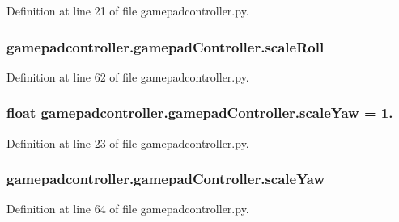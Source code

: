 Definition at line 21 of file gamepadcontroller.\-py.

\hypertarget{classgamepadcontroller_1_1gamepadController_aba4b8e93dc52cb30c7069a366ab03bcc}{
\subsubsection[{scale\-Roll}]{\setlength{\rightskip}{0pt plus 5cm}gamepadcontroller.\-gamepad\-Controller.\-scale\-Roll}}\label{classgamepadcontroller_1_1gamepadController_aba4b8e93dc52cb30c7069a366ab03bcc}


Definition at line 62 of file gamepadcontroller.\-py.

\hypertarget{classgamepadcontroller_1_1gamepadController_a5b8de0ec2f3c6f1a81997266e1b91d24}{
\subsubsection[{scale\-Yaw}]{\setlength{\rightskip}{0pt plus 5cm}float gamepadcontroller.\-gamepad\-Controller.\-scale\-Yaw = 1.\hspace{0.3cm}{\ttfamily [static]}}}\label{classgamepadcontroller_1_1gamepadController_a5b8de0ec2f3c6f1a81997266e1b91d24}


Definition at line 23 of file gamepadcontroller.\-py.

\hypertarget{classgamepadcontroller_1_1gamepadController_ad9e4b5c372ecf121fd1a45baba34cfb8}{
\subsubsection[{scale\-Yaw}]{\setlength{\rightskip}{0pt plus 5cm}gamepadcontroller.\-gamepad\-Controller.\-scale\-Yaw}}\label{classgamepadcontroller_1_1gamepadController_ad9e4b5c372ecf121fd1a45baba34cfb8}


Definition at line 64 of file gamepadcontroller.\-py.

